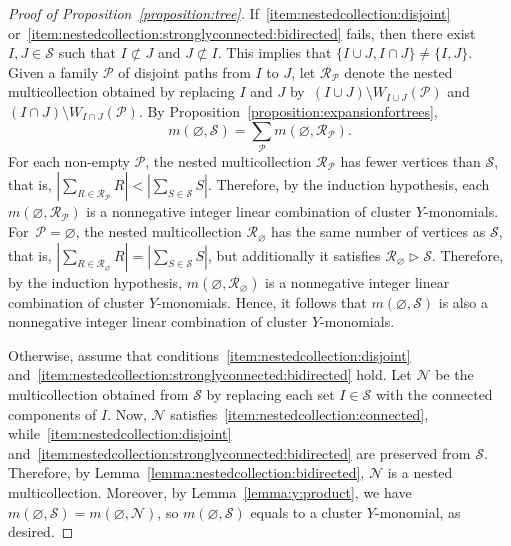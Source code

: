 \documentclass[11pt]{article}
\theoremstyle{definition}
\numberwithin{equation}{section}
\newcommand{\monomial}[2]{m(#1, #2)}
\begin{document}
\begin{proof}[Proof of Proposition~\ref{proposition:tree}]
    If~\ref{item:nestedcollection:disjoint} or~\ref{item:nestedcollection:stronglyconnected:bidirected} fails,
    then there exist \(I, J \in \mathcal{S}\)
    such that \(I \not\subset J\) and \(J \not\subset I\).
    This implies that \(\{I \cup J, I \cap J\} \neq \{I, J\}\).
    Given a family \(\mathcal{P}\) of disjoint paths from \(I\) to \(J\),
    let \(\mathcal{R}_{\mathcal{P}}\) denote the nested multicollection obtained by replacing \(I\) and \(J\) by~\((I \cup J) \setminus W_{I \cup J}(\mathcal{P})\) and \((I \cap J) \setminus W_{I \cap J}(\mathcal{P})\).
    By Proposition~\ref{proposition:expansionfortrees},
    \begin{equation*}
        \monomial{\varnothing}{\mathcal{S}}
        =
        \sum_{\mathcal{P}} \monomial{\varnothing}{\mathcal{R}_{\mathcal{P}}}.
    \end{equation*}
    For each non-empty \(\mathcal{P}\), the nested multicollection \(\mathcal{R}_{\mathcal{P}}\) has fewer vertices than \(\mathcal{S}\),
    that is, \(\left|\sum_{R \in \mathcal{R}_{\mathcal{P}}} R\right| < \left|\sum_{S \in \mathcal{S}} S\right|\).
    Therefore, by the induction hypothesis, each \(\monomial{\varnothing}{\mathcal{R}_{\mathcal{P}}}\) is a nonnegative integer linear combination of cluster \(Y\)-monomials.
    For~\(\mathcal{P} = \varnothing\), the nested multicollection \(\mathcal{R}_{\varnothing}\) has the same number of vertices as \(\mathcal{S}\),
    that is, \mbox{\(\left|\sum_{R \in \mathcal{R}_{\varnothing}} R\right| = \left|\sum_{S \in \mathcal{S}} S\right|\)},
    but additionally it satisfies \(\mathcal{R}_{\varnothing} \triangleright \mathcal{S}\).
    Therefore, by the induction hypothesis, \(\monomial{\varnothing}{\mathcal{R}_{\varnothing}}\) is a nonnegative integer linear combination of cluster \(Y\)-monomials.
    Hence, it follows that \(\monomial{\varnothing}{\mathcal{S}}\) is also a nonnegative integer linear combination of cluster \(Y\)-monomials.

    Otherwise, assume that conditions~\ref{item:nestedcollection:disjoint} and~\ref{item:nestedcollection:stronglyconnected:bidirected} hold.
    Let \(\mathcal{N}\) be the multicollection
    obtained from \(\mathcal{S}\) by replacing each set \(I \in \mathcal{S}\) with the connected components of \(I\).
    Now, \(\mathcal{N}\) satisfies~\ref{item:nestedcollection:connected},
    while~\ref{item:nestedcollection:disjoint} and~\ref{item:nestedcollection:stronglyconnected:bidirected} are preserved from \(\mathcal{S}\).
    Therefore,
    by Lemma~\ref{lemma:nestedcollection:bidirected},
    \(\mathcal{N}\) is a nested multicollection.
    Moreover, by Lemma~\ref{lemma:y:product}, we have \(\monomial{\varnothing}{\mathcal{S}} = \monomial{\varnothing}{\mathcal{N}}\),
    so \(\monomial{\varnothing}{\mathcal{S}}\) equals to a cluster \(Y\)-monomial, as desired.
\end{proof}
\end{document}
